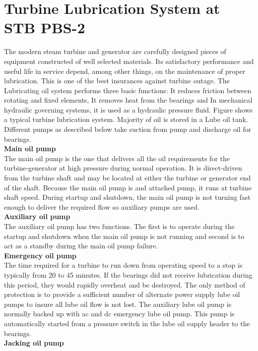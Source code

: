 \documentclass[english,11pt]{report}
\begin{document}
\section{Turbine Lubrication System at STB PBS-2}
The modern steam turbine and generator are carefully designed pieces of equipment constructed of well selected materials. Its satisfactory performance and useful life in service depend, among other things, on the maintenance of proper lubrication. This is one of the best insurances against turbine outage. The Lubricating oil system performs three basic functions: It reduces friction between rotating and fixed elements, It removes heat from the bearings and In mechanical hydraulic governing systems, it is used as a hydraulic pressure fluid.
Figure shows a typical turbine lubrication system. Majority of oil is stored in a Lube oil tank. Different pumps as described below take suction from pump and discharge oil for bearings. \\
\textbf{Main oil pump}\\
The main oil pump is the one that delivers all the oil requirements for the turbine-generator at high pressure during normal operation. It is direct-driven from the turbine shaft and may be located at either the turbine or generator end of the shaft. Because the main oil pump is and attached pump, it runs at turbine shaft speed. During startup and shutdown, the main oil pump is not turning fast enough to deliver the required flow so auxiliary pumps are used.\\
\textbf{Auxiliary oil pump}\\
The auxiliary oil pump has two functions. The first is to operate during the startup and shutdown when the main oil pump is not running and second is to act as a standby during the main oil pump failure. \\
\textbf{Emergency oil pump}\\ 
The time required for a turbine to run down from operating speed to a stop is typically from 20 to 45 minutes. If the bearings did not receive lubrication during this period, they would rapidly overheat and be destroyed. The only method of protection is to provide a sufficient number of alternate power supply lube oil pumps to insure all lube oil flow is not lost. The auxiliary lube oil pump is normally backed up with ac and dc emergency lube oil pump. This pump is automatically started from a pressure switch in the lube oil supply header to the bearings. \\
\textbf{Jacking oil pump }\\
\end{document}
